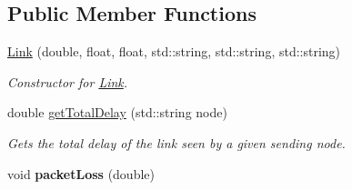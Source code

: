 \subsection*{\-Public \-Member \-Functions}
\begin{DoxyCompactItemize}
\item 
\hyperlink{classLink_af0a6ae4d9767bacfb371f52a30441e64}{\-Link} (double, float, float, std\-::string, std\-::string, std\-::string)
\begin{DoxyCompactList}\small\item\em \-Constructor for \hyperlink{classLink}{\-Link}. \end{DoxyCompactList}\item 
double \hyperlink{classLink_a19a132f87f8028ccd5af2503084aac64}{get\-Total\-Delay} (std\-::string node)
\begin{DoxyCompactList}\small\item\em \-Gets the total delay of the link seen by a given sending node. \end{DoxyCompactList}\item 
\hypertarget{classLink_a94f034f0b3ebfbf4c08bcae80a5d9904}{void {\bfseries packet\-Loss} (double)}\label{classLink_a94f034f0b3ebfbf4c08bcae80a5d9904}


\end{DoxyCompactItemize}
